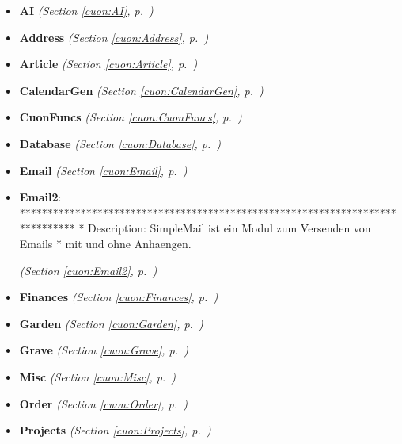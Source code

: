 \begin{itemize}
\setlength{\parskip}{0ex}
\item \textbf{AI}
  \textit{(Section \ref{cuon:AI}, p.~\pageref{cuon:AI})}

\item \textbf{Address}
  \textit{(Section \ref{cuon:Address}, p.~\pageref{cuon:Address})}

\item \textbf{Article}
  \textit{(Section \ref{cuon:Article}, p.~\pageref{cuon:Article})}

\item \textbf{CalendarGen}
  \textit{(Section \ref{cuon:CalendarGen}, p.~\pageref{cuon:CalendarGen})}

\item \textbf{CuonFuncs}
  \textit{(Section \ref{cuon:CuonFuncs}, p.~\pageref{cuon:CuonFuncs})}

\item \textbf{Database}
  \textit{(Section \ref{cuon:Database}, p.~\pageref{cuon:Database})}

\item \textbf{Email}
  \textit{(Section \ref{cuon:Email}, p.~\pageref{cuon:Email})}

\item \textbf{Email2}: ******************************************************************************
* Description:  SimpleMail ist ein Modul zum Versenden von Emails *
mit und ohne Anhaengen.



  \textit{(Section \ref{cuon:Email2}, p.~\pageref{cuon:Email2})}

\item \textbf{Finances}
  \textit{(Section \ref{cuon:Finances}, p.~\pageref{cuon:Finances})}

\item \textbf{Garden}
  \textit{(Section \ref{cuon:Garden}, p.~\pageref{cuon:Garden})}

\item \textbf{Grave}
  \textit{(Section \ref{cuon:Grave}, p.~\pageref{cuon:Grave})}

\item \textbf{Misc}
  \textit{(Section \ref{cuon:Misc}, p.~\pageref{cuon:Misc})}

\item \textbf{Order}
  \textit{(Section \ref{cuon:Order}, p.~\pageref{cuon:Order})}

\item \textbf{Projects}
  \textit{(Section \ref{cuon:Projects}, p.~\pageref{cuon:Projects})}


\end{itemize}
